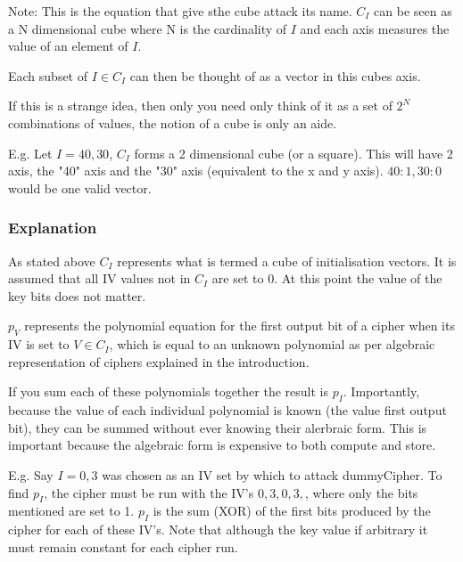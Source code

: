 \documentclass{report}
\let\Oldsubsubsection\subsubsection
\renewcommand{\subsubsection}{\FloatBarrier\Oldsubsubsection}
\begin{document}
Note: This is the equation that give sthe cube attack its name. $C_I$ can be seen as a N dimensional cube where N is the cardinality of $I$ and each axis measures the value of an element of $I$.

Each subset of $I \in C_I$ can then be thought of as a vector in this cubes axis.

If this is a strange idea, then only you need only think of it as a set of $2^N$ combinations of values, the notion of a cube is only an aide. 

E.g. Let $I = {40, 30}$, $C_I$ forms a 2 dimensional cube (or a square). This will have 2 axis, the "40" axis and the "30" axis (equivalent to the x and y axis). ${40:1, 30:0}$ would be one valid vector.

\begin{figure}[g]
\end{figure}


\subsubsection{Explanation}
As stated above $C_I$ represents what is termed a cube of initialisation vectors. It is assumed that all IV values not in $C_I$ are set to 0. At this point the value of the key bits does not matter.

$p_V$ represents the polynomial equation for the first output bit of a cipher when its IV is set to $V \in C_I$, which is equal to an unknown polynomial as per algebraic representation of ciphers explained in the introduction.

If you sum each of these polynomials together the result is $p_I$. Importantly, because the value of each individual polynomial is known (the value first output bit), they can be summed without ever knowing their alerbraic form. This is important because the algebraic form is expensive to both compute and store.

E.g. Say $I={0,3}$ was chosen as an IV set by which to attack dummyCipher. To find $p_I$, the cipher must be run with the IV's ${{0}, {3}, {0,3}, {}}$, where only the bits mentioned are set to 1. $p_I$ is the sum (XOR) of the first bits produced by the cipher for each of these IV's. Note that although the key value if arbitrary it must remain constant for each cipher run.
\end{document}
